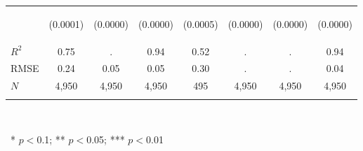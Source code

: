 \begin{center}
\begin{tabular}{lccccccc}
 & \begin{footnotesize}(0.0001)\end{footnotesize} & \begin{footnotesize}(0.0000)\end{footnotesize} & \begin{footnotesize}(0.0000)\end{footnotesize} & \begin{footnotesize}(0.0005)\end{footnotesize} & \begin{footnotesize}(0.0000)\end{footnotesize} & \begin{footnotesize}(0.0000)\end{footnotesize} & \begin{footnotesize}(0.0000)\end{footnotesize}\\
\noalign{\smallskip}$R^2$ & 0.75 & . & 0.94 & 0.52 & . & . & 0.94\\
RMSE & 0.24 & 0.05 & 0.05 & 0.30 & . & . & 0.04\\
$N$ & 4,950 & 4,950 & 4,950 & 495 & 4,950 & 4,950 & 4,950\\
\noalign{\smallskip}\hline\end{tabular}\\
\smallskip\begin{footnotesize}\ * $p<0$.1; ** $p<0$.05; *** $p<0$.01\end{footnotesize}\\
\smallskip
\end{center}
